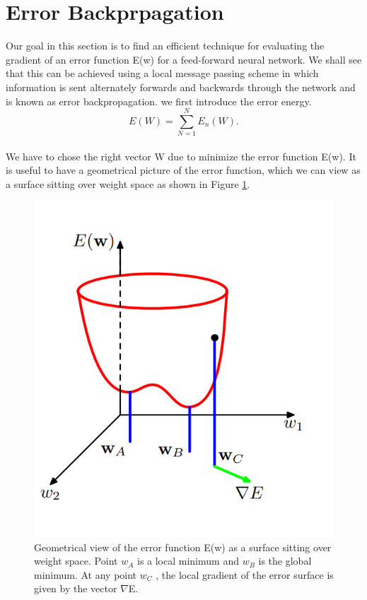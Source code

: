 \documentclass[a4paper, 10pt]{book}
\begin{document}
\section{Error Backprpagation}
Our goal in this section is to find an efficient technique for evaluating the gradient
of an error function E(w) for a feed-forward neural network. We shall see that this can be achieved using a local message passing scheme in which information is sent alternately forwards and backwards through the network and is known as error backpropagation.
we first introduce the error energy.
\begin{equation}
    \label{eqn:Error Energy}
E(W)= \sum\limits_{N=1}^N E_n(W).
\end{equation}
\\
We have to chose the right vector W due to minimize  the error function E(w).
It is useful to have a geometrical picture of the error function, 
which we can view as a surface sitting over weight space as shown in
Figure \ref{fgr:gradient}.
\begin{figure}[H]
    \centering
    \includegraphics[scale=1]{gradient_sr_1.png}
    \caption{Geometrical view of the error function E(w) as
a surface sitting over weight space. Point $w_A$ is
a local minimum and $w_B$ is the global minimum.
At any point $w_C$ , the local gradient of the error
surface is given by the vector $\nabla $E.}
\label{fgr:gradient}
\end{figure}
\end{document}

